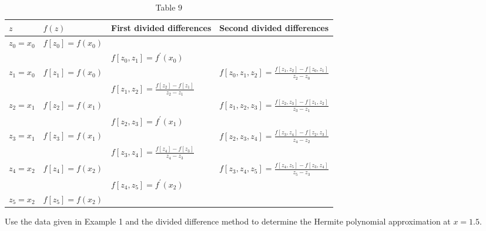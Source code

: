 \begin{table}
\centering
\begin{tabular}{|l|l|l|l|}
\hline
$z$ & $f(z)$ & First divided differences & Second divided differences \\
\hline
$z_{0}=x_{0}$ & $f\left[z_{0}\right]=f\left(x_{0}\right)$ &  &  \\
\hline
 &  & $f\left[z_{0}, z_{1}\right]=f^{\prime}\left(x_{0}\right)$ &  \\
\hline
$z_{1}=x_{0}$ & $f\left[z_{1}\right]=f\left(x_{0}\right)$ &  & $f\left[z_{0}, z_{1}, z_{2}\right]=\frac{f\left[z_{1}, z_{2}\right]-f\left[z_{0}, z_{1}\right]}{z_{2}-z_{0}}$ \\
\hline
 &  & $f\left[z_{1}, z_{2}\right]=\frac{f\left[z_{2}\right]-f\left[z_{1}\right]}{z_{2}-z_{1}}$ &  \\
\hline
$z_{2}=x_{1}$ & $f\left[z_{2}\right]=f\left(x_{1}\right)$ &  & $f\left[z_{1}, z_{2}, z_{3}\right]=\frac{f\left[z_{2}, z_{3}\right]-f\left[z_{1}, z_{2}\right]}{z_{3}-z_{1}}$ \\
\hline
 &  & $f\left[z_{2}, z_{3}\right]=f^{\prime}\left(x_{1}\right)$ &  \\
\hline
$z_{3}=x_{1}$ & $f\left[z_{3}\right]=f\left(x_{1}\right)$ &  & $f\left[z_{2}, z_{3}, z_{4}\right]=\frac{f\left[z_{3}, z_{4}\right]-f\left[z_{2}, z_{3}\right]}{z_{4}-z_{2}}$ \\
\hline
 &  & $f\left[z_{3}, z_{4}\right]=\frac{f\left[z_{4}\right]-f\left[z_{3}\right]}{z_{4}-z_{3}}$ &  \\
\hline
$z_{4}=x_{2}$ & $f\left[z_{4}\right]=f\left(x_{2}\right)$ &  & $f\left[z_{3}, z_{4}, z_{5}\right]=\frac{f\left[z_{4}, z_{5}\right]-f\left[z_{3}, z_{4}\right]}{z_{5}-z_{3}}$ \\
\hline
 &  & $f\left[z_{4}, z_{5}\right]=f^{\prime}\left(x_{2}\right)$ &  \\
\hline
$z_{5}=x_{2}$ & $f\left[z_{5}\right]=f\left(x_{2}\right)$ &  &  \\
\hline
\end{tabular}
\caption{\scriptsize Table $9$}
\label{tab:hermite2}
\end{table}

\begin{example}
Use the data given in Example 1 and the divided difference method to determine the Hermite polynomial approximation at $x=1.5$.
\end{example}

